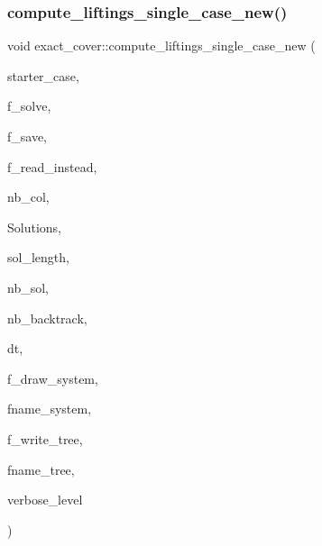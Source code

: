 \subsubsection{\texorpdfstring{compute\+\_\+liftings\+\_\+single\+\_\+case\+\_\+new()}{compute\_liftings\_single\_case\_new()}}
{\footnotesize\ttfamily void exact\+\_\+cover\+::compute\+\_\+liftings\+\_\+single\+\_\+case\+\_\+new (\begin{DoxyParamCaption}\item[{\mbox{\hyperlink{galois_8h_a09fddde158a3a20bd2dcadb609de11dc}{I\+NT}}}]{starter\+\_\+case,  }\item[{\mbox{\hyperlink{galois_8h_a09fddde158a3a20bd2dcadb609de11dc}{I\+NT}}}]{f\+\_\+solve,  }\item[{\mbox{\hyperlink{galois_8h_a09fddde158a3a20bd2dcadb609de11dc}{I\+NT}}}]{f\+\_\+save,  }\item[{\mbox{\hyperlink{galois_8h_a09fddde158a3a20bd2dcadb609de11dc}{I\+NT}}}]{f\+\_\+read\+\_\+instead,  }\item[{\mbox{\hyperlink{galois_8h_a09fddde158a3a20bd2dcadb609de11dc}{I\+NT}} \&}]{nb\+\_\+col,  }\item[{\mbox{\hyperlink{galois_8h_a09fddde158a3a20bd2dcadb609de11dc}{I\+NT}} $\ast$\&}]{Solutions,  }\item[{\mbox{\hyperlink{galois_8h_a09fddde158a3a20bd2dcadb609de11dc}{I\+NT}} \&}]{sol\+\_\+length,  }\item[{\mbox{\hyperlink{galois_8h_a09fddde158a3a20bd2dcadb609de11dc}{I\+NT}} \&}]{nb\+\_\+sol,  }\item[{\mbox{\hyperlink{galois_8h_a09fddde158a3a20bd2dcadb609de11dc}{I\+NT}} \&}]{nb\+\_\+backtrack,  }\item[{\mbox{\hyperlink{galois_8h_a09fddde158a3a20bd2dcadb609de11dc}{I\+NT}} \&}]{dt,  }\item[{\mbox{\hyperlink{galois_8h_a09fddde158a3a20bd2dcadb609de11dc}{I\+NT}}}]{f\+\_\+draw\+\_\+system,  }\item[{const \mbox{\hyperlink{galois_8h_ab6cc7b4aeb6ea31aba2b3fbfc83ff5e6}{B\+Y\+TE}} $\ast$}]{fname\+\_\+system,  }\item[{\mbox{\hyperlink{galois_8h_a09fddde158a3a20bd2dcadb609de11dc}{I\+NT}}}]{f\+\_\+write\+\_\+tree,  }\item[{const \mbox{\hyperlink{galois_8h_ab6cc7b4aeb6ea31aba2b3fbfc83ff5e6}{B\+Y\+TE}} $\ast$}]{fname\+\_\+tree,  }\item[{\mbox{\hyperlink{galois_8h_a09fddde158a3a20bd2dcadb609de11dc}{I\+NT}}}]{verbose\+\_\+level }\end{DoxyParamCaption})}

